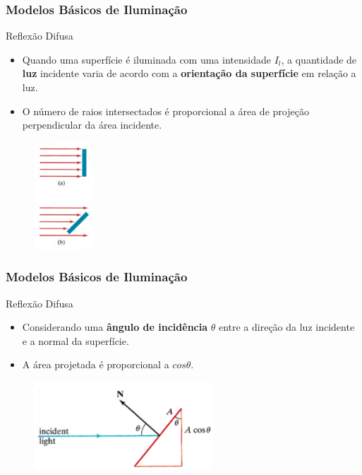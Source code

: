 \documentclass{beamer}
\begin{document}
\begin{frame}
\frametitle{Modelos Básicos de Iluminação}

	\begin{block}{Reflexão Difusa}
		\begin{itemize}
			\item Quando uma superfície é iluminada com uma intensidade $I_l$, a quantidade de \textbf{luz} incidente varia de acordo com a \textbf{orientação da superfície} em relação a luz.
			\item O número de raios intersectados é proporcional a área de projeção perpendicular da área incidente.					 
		\end{itemize}
	\end{block}
	
	\begin{figure}[!h]
		\begin{center}
		\includegraphics[width=0.2\textwidth]{Figures/RefLuz}
		\end{center}
	\end{figure}	
	
\end{frame}


\begin{frame}
\frametitle{Modelos Básicos de Iluminação}

	\begin{block}{Reflexão Difusa}
		\begin{itemize}
			\item Considerando uma \textbf{ângulo de incidência} $\theta$ entre a direção da luz incidente e a normal da superfície.
			\item A área projetada é proporcional a $cos \theta$.				 
		\end{itemize}
	\end{block}
	
	\begin{figure}[!h]
		\begin{center}
		\includegraphics[width=0.6\textwidth]{Figures/RefRai}
		\end{center}
	\end{figure}	
	
\end{frame}
\end{document}
